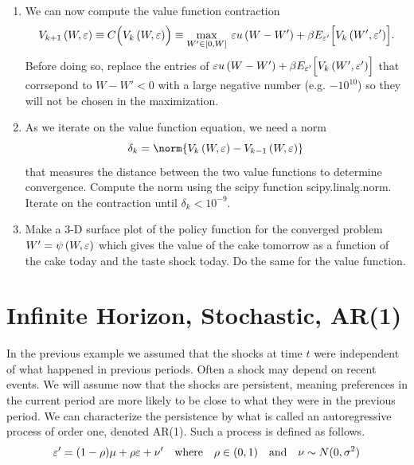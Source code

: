 \begin{problem}
\begin{enumerate}
   \item We can now compute the value function contraction
     \begin{equation}\label{EqContractStochiid}
      V_{k+1}\left(W,\varepsilon\right) \equiv C\Bigl(V_k\left(W,\varepsilon\right)\Bigr) \equiv \max_{W'\in[0,W]}\: \varepsilon u\left(W-W'\right) + \beta E_{\varepsilon'}\Bigl[V_k\left(W',\varepsilon'\right)\Bigr].
      \end{equation}
        Before doing so, replace the entries of $\varepsilon u\left(W-W'\right) + \beta E_{\varepsilon'}\Bigl[V_k\left(W',\varepsilon'\right)\Bigr]$ that corrsepond to $W-W' < 0$ with a large negative number (e.g. $-10^{10}$) so they will not be chosen in the maximization.

   \item As we iterate on the value function equation, we need a norm 
    \begin{equation*}
        \delta_k = \norm{V_k\left(W,\ve\right) - V_{k-1}\left(W,\ve\right)}
    \end{equation*}
    that measures the distance between the two value functions to determine convergence.  Compute the norm using the scipy function scipy.linalg.norm.  Iterate on the contraction until $\delta_k < 10^{-9}$.

   \item Make a 3-D surface plot of the policy function for the converged problem $W' = \psi\left(W,\varepsilon\right)$ which gives the value of the cake tomorrow as a function of the cake today  and the taste shock today.  Do the same for the value function.

\end{enumerate}
\end{problem}

\newpage
\section{Infinite Horizon, Stochastic, AR(1)}\label{SecRecProbInfinHorStochAR1}

In the previous example we assumed that the shocks at time $t$ were independent of what happened in previous periods.  Often a shock may depend on recent events.  We will assume now that the shocks are persistent, meaning preferences in the current period are more likely to be close to what they were in the previous period.  We can characterize the persistence by what is called an autoregressive process of order one, denoted AR(1).  Such a process is defined as follows.
\begin{equation}\label{EqAR1shock}
   \varepsilon' = (1-\rho)\mu + \rho\varepsilon + \nu' \quad\text{where}\quad \rho\in(0,1) \quad\text{and}\quad \nu\sim N(0,\sigma^2)
\end{equation}

